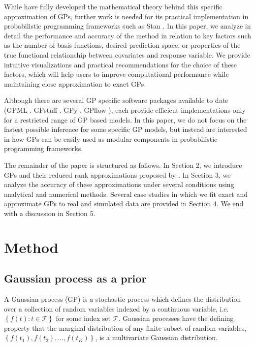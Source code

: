 \documentclass[]{interact}
\theoremstyle{plain}%
\theoremstyle{definition}
\theoremstyle{remark}
\begin{document}
While \citet{solin2018hilbert} have fully developed the mathematical theory behind this specific approximation of GPs, further work is needed for its practical implementation in probabilistic programming frameworks such as Stan \citep{carpenter2017stan}. In this paper, we analyze in detail the performance and accuracy of the method in relation to key factors such as the number of basis functions, desired prediction space, or properties of the true functional relationship between covariates and response variable. We provide intuitive visualizations and practical recommendations for the choice of these factors, which will help users to improve computational performance while maintaining close approximation to exact GPs. 

Although there are several GP specific software packages available to date (GPML \citep{rasmussen2010gpml},  GPstuff \citep{vanhatalo2013gpstuff}, GPy \citep{gpy2014}, GPflow \citep{GPflow2017}), each provide efficient implementations only for a restricted range of GP based models. In this paper, we do not focus on the fastest possible inference for some specific GP models, but instead are interested in how GPs can be easily used as modular components in probabilistic programming frameworks. 

The remainder of the paper is structured as follows. In Section 2, we introduce GPs and their reduced rank approximations proposed by \cite{solin2018hilbert}. In Section 3, we analyze the accuracy of these approximations under several conditions using analytical and numerical methods. Several case studies in which we fit
exact and approximate GPs to real and simulated data are provided in Section 4. We end with a discussion in Section 5.


\vspace{3mm}
\section{Method}\label{sec:bf_method}

\subsection{Gaussian process as a prior}

A Gaussian process (GP) is a stochastic process which defines the distribution over a collection of random variables indexed by a continuous variable, i.e. $\left\lbrace f(t): t \in \mathcal{T}\right\rbrace$ for some index set $\mathcal{T}$. Gaussian processes have the defining property that the marginal distribution of any finite subset of random variables, $\left\lbrace f(t_1), f(t_2), \hdots, f(t_K) \right\rbrace$, is a multivariate Gaussian distribution.
\end{document}
